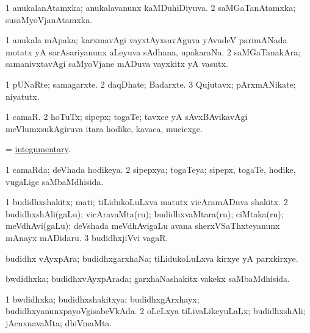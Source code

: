 \bentry
{}
\gl{\gu}
\bmng
\bnum
\num{1} anukalanAtamxka; anukalavanunx kaMDuhiDiyuva. 
\num{2} saMGaTanAtamxka; susaMyoVjanAtamxka. 
\enum
\emng
\eentry

\bentry
{}
\gl{\nA}
\bmng
\bnum
\num{1} anukala mApaka; karxmavAgi vayxtAyxsavAguva yAvudeV parimANada motatx yA sarAsariyanunx aLeyuva sAdhana, upakaraNa. 
\num{2} saMGaTanakAra; samanivxtavAgi saMyoVjane mADuva vayxkitx yA vasutx. 
\enum
\emng
\eentry

\bentry
{}
\gl{\nA}
\bmng
\bnum
\num{1} pUNaRte; samagarxte. 
\num{2} daqDhate; Badarxte. 
\num{3} Qujutavx; pArxmANikate; niyatutx. 
\enum
\emng
\eentry

\bentry
{}
\gl{\nA}
\bmng
\bnum
\num{1} camaR. 
\num{2} hoTuTx; sipepx; togaTe; tavxce yA sAvxBAvikavAgi meVlumxsukAgiruva itara hodike, kavaca, mucicxge. 
\enum
\emng
\eentry

\bentry
{}
\gl{\gu}
\bmng
= \hyperlink{integumentary}{integumentary}. 
\emng
\eentry

\bentry
{}
\gl{\gu}
\bmng
\bnum
\num{1} camaRda; deVhada hodikeya. 
\num{2} sipepxya; togaTeya; sipepx, togaTe, hodike, \mo vugaLige saMbaMdhisida. 
\enum
\emng
\eentry

\bentry
{}
\gl{\nA}
\bmng
\bnum
\num{1} budidhxshakitx; mati; tiLidukoLuLxva matutx vicAramADuva shakitx. 
\num{2} budidhxshAli(gaLu); vicAravaMta(ru); budidhxvaMtara(ru); ciMtaka(ru); meVdhAvi(gaLu):  deVshada meVdhAvigaLu avana sherxVSaThxteyanunx mAnayx mADidaru. 
\num{3} budidhxjiVvi vagaR. 
\enum
\emng
\eentry

\bentry
{}
\gl{\nA}
\bmng
budidhx vAyxpAra; budidhxgarxhaNa; tiLidukoLuLxva kirxye yA parxkirxye. 
\emng
\eentry

\bentry
{}
\gl{\gu}
\bmng
bwdidhxka; budidhxvAyxpArada; garxhaNashakitx \mo vakekx saMbaMdhisida. 
\emng
\eentry

\bentry
{}
\gl{\gu}
\bmng
\bnum
\num{1} bwdidhxka; budidhxshakitxya; budidhxgArxhayx; budidhxyanunxpayoVgisabeVkAda. 
\num{2} oLeLxya tiLivaLikeyuLaLx; budidhxshAli; jAcnxnavaMta; dhiVmaMta. 
\enum
\emng
\eentry

